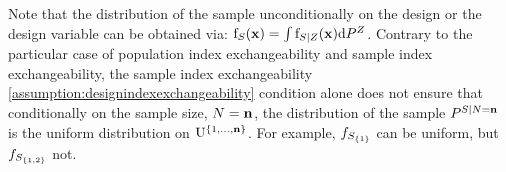 Note that the distribution of the sample unconditionally on the design or the design variable can be obtained via: 
$\mathrm{f}_{S}(\mathbf{x})=\int \mathrm{f}_{S\mid Z}(\mathbf{x})\mathrm{d} P^Z$.
Contrary to the particular case of population index exchangeability and sample index exchangeability, the sample index exchangeability \eqref{assumption:designindexexchangeability} condition alone does not ensure that conditionally on the sample size, $N=\mathbf{n}$, the distribution of the sample  $P^{S\mid N=\mathbf{n}}$ is the uniform distribution on $\mathrm{U}^{\{1,\ldots,\mathbf{n}\}}$. 
For example, $f_{S_{\{1\}}}$ can be uniform, but $f_{S_{\{1,2\}}}$ not.
